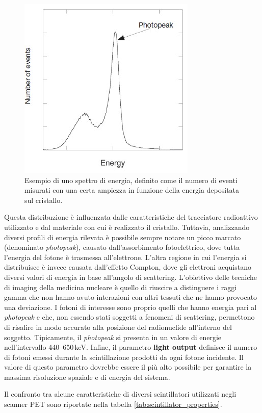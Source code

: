 \begin{figure}[b!]
	\centering
	\includegraphics[width=0.38\linewidth]{./ImageFiles/Photo peak.jpg}
	\caption{Esempio di uno spettro di energia, definito come il numero di eventi misurati con una certa ampiezza in funzione della energia depositata sul cristallo\cite{Bailey2014}.}
	\label{fig:photo_peak}
\end{figure}
Questa distribuzione è influenzata dalle caratteristiche del tracciatore radioattivo utilizzato e dal materiale con cui è realizzato il cristallo. Tuttavia, analizzando diversi profili di energia rilevata è possibile sempre notare un picco marcato (denominato \textit{photopeak}), causato dall'assorbimento fotoelettrico, dove tutta l'energia del fotone è trasmessa all'elettrone. L'altra regione in cui l'energia si distribuisce è invece causata dall'effetto Compton, dove gli elettroni acquistano diversi valori di energia in base all'angolo di scattering. L'obiettivo delle tecniche di imaging della medicina nucleare è quello di riuscire a distinguere i raggi gamma che non hanno avuto interazioni con altri tessuti che ne hanno provocato una deviazione. I fotoni di interesse sono proprio quelli che hanno energia pari al \textit{photopeak} e che, non essendo stati soggetti a fenomeni di scattering, permettono di risalire in modo accurato alla posizione del radionuclide all'interno del soggetto. Tipicamente, il \textit{photopeak} si presenta in un valore di energie nell'intervallo \numrange[range-phrase=--]{440}{650}\,\unit{\kilo\electronvolt}. Infine, il parametro \textbf{light output} definisce il numero di fotoni emessi durante la scintillazione prodotti da ogni fotone incidente. Il valore di questo parametro dovrebbe essere il più alto possibile per garantire la massima risoluzione spaziale e di energia del sistema.

\noindent
Il confronto tra alcune caratteristiche di diversi scintillatori utilizzati negli scanner PET sono riportate nella tabella \ref{tab:scintillator_properties}.

